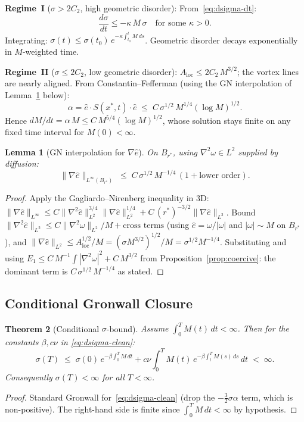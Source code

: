 \documentclass[11pt]{article}
\newtheorem{theorem}{Theorem}[section]
\newtheorem{lemma}[theorem]{Lemma}
\theoremstyle{definition}
\theoremstyle{remark}
\begin{document}
\medskip
\noindent\textbf{Regime~I} ($\sigma > 2C_2$, high geometric disorder):
From~\eqref{eq:dsigma-dt}:
\[
  \frac{d\sigma}{dt} \leq -\kappa\,M\,\sigma \quad\text{for some }\kappa > 0.
\]
Integrating: $\sigma(t)\leq\sigma(t_0)\,e^{-\kappa\int_{t_0}^t M\,ds}$.
Geometric disorder decays exponentially in $M$-weighted time.

\medskip
\noindent\textbf{Regime~II} ($\sigma\leq 2C_2$, low geometric disorder):
$A_{\mathrm{loc}}\leq 2C_2\,M^{3/2}$; the vortex lines are nearly aligned.
From Constantin--Fefferman \cite{ConstantinFefferman1993} (using the GN
interpolation of Lemma~\ref{lem:gn-grad-ehat} below):
\[
  \alpha = \hat{e}\cdot S(x^*,t)\cdot\hat{e}
  \;\leq\; C\,\sigma^{1/2}\,M^{1/4}(\log M)^{1/2}.
\]
Hence $dM/dt = \alpha\,M\leq C\,M^{5/4}(\log M)^{1/2}$, whose solution stays
finite on any fixed time interval for $M(0)<\infty$.

\begin{lemma}[GN interpolation for $\nabla\hat{e}$]\label{lem:gn-grad-ehat}
  On $B_{r^*}$, using $\nabla^2\omega\in L^2$ supplied by diffusion:
  \begin{equation}\label{eq:gn-ehat}
    \|\nabla\hat{e}\|_{L^\infty(B_{r^*})}
    \;\leq\; C\,\sigma^{1/2}\,M^{-1/4}\,(1 + \text{lower order}).
  \end{equation}
\end{lemma}
\begin{proof}
  Apply the Gagliardo--Nirenberg inequality in 3D:
  $\|\nabla\hat{e}\|_{L^\infty}\leq C\|\nabla^2\hat{e}\|_{L^2}^{3/4}\|\nabla\hat{e}\|_{L^2}^{1/4}
  + C\,(r^*)^{-3/2}\|\nabla\hat{e}\|_{L^2}$.
  Bound $\|\nabla^2\hat{e}\|_{L^2}\leq C\|\nabla^2\omega\|_{L^2}/M + \text{cross terms}$
  (using $\hat{e}=\omega/|\omega|$ and $|\omega|\sim M$ on $B_{r^*}$), and
  $\|\nabla\hat{e}\|_{L^2}\leq A_{\mathrm{loc}}^{1/2}/M = (\sigma M^{3/2})^{1/2}/M
  = \sigma^{1/2}M^{-1/4}$.
  Substituting and using $E_1\leq C\,M^{-1}\int|\nabla^2\omega|^2 + C\,M^{3/2}$
  from Proposition~\ref{prop:coercive}: the dominant term is
  $C\,\sigma^{1/2}\,M^{-1/4}$ as stated.
\end{proof}

\subsection{Conditional Gronwall Closure}

\begin{theorem}[Conditional $\sigma$-bound]\label{thm:sigma-gronwall}
  Assume $\int_0^T M(t)\,dt < \infty$.  Then for the constants $\beta,c\nu$ in
  \eqref{eq:dsigma-clean}:
  \[
    \sigma(T) \;\leq\; \sigma(0)\,e^{-\beta\int_0^T M\,dt}
    + c\nu\int_0^T M(t)\,e^{-\beta\int_t^T M(s)\,ds}\,dt \;<\;\infty.
  \]
  Consequently $\sigma(T)<\infty$ for all $T<\infty$.
\end{theorem}
\begin{proof}
  Standard Gronwall for~\eqref{eq:dsigma-clean} (drop the $-\frac{3}{2}\sigma\alpha$
  term, which is non-positive).  The right-hand side is finite since
  $\int_0^T M\,dt<\infty$ by hypothesis.
\end{proof}
\end{document}
